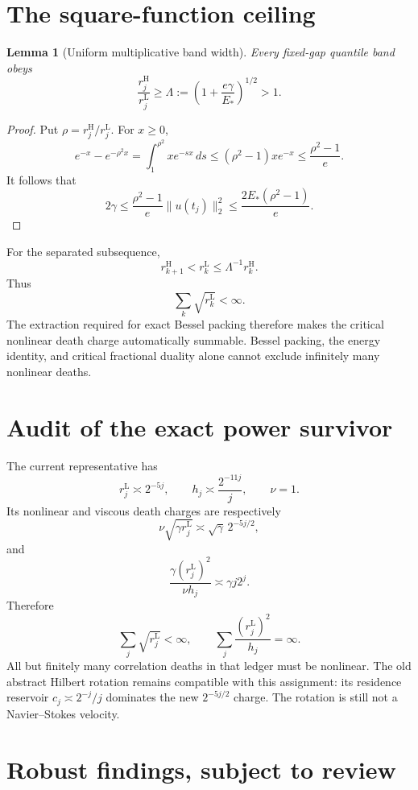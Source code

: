 \documentclass[11pt]{article}
\newtheorem{lemma}[theorem]{Lemma}
\theoremstyle{remark}
\begin{document}
\section{The square-function ceiling}

\begin{lemma}[Uniform multiplicative band width]
Every fixed-gap quantile band obeys
\[
 \frac{r_j^{\mathrm H}}{r_j^{\mathrm L}}
 \ge
 \Lambda
 :=
 \left(1+\frac{e\gamma}{E_*}\right)^{1/2}>1.
\]
\end{lemma}

\begin{proof}
Put \(\rho=r_j^{\mathrm H}/r_j^{\mathrm L}\).  For \(x\ge0\),
\[
 e^{-x}-e^{-\rho^2x}
 =
 \int_1^{\rho^2}xe^{-sx}\,ds
 \le
 (\rho^2-1)xe^{-x}
 \le
 \frac{\rho^2-1}{e}.
\]
It follows that
\[
 2\gamma
 \le
 \frac{\rho^2-1}{e}\|u(t_j)\|_2^2
 \le
 \frac{2E_*(\rho^2-1)}{e}.
\]
\end{proof}

For the separated subsequence,
\[
 r_{k+1}^{\mathrm H}
 <
 r_k^{\mathrm L}
 \le
 \Lambda^{-1}r_k^{\mathrm H}.
\]
Thus
\[
 \sum_k\sqrt{r_k^{\mathrm L}}<\infty.
\]
The extraction required for exact Bessel packing therefore makes the
critical nonlinear death charge automatically summable.  Bessel packing,
the energy identity, and critical fractional duality alone cannot exclude
infinitely many nonlinear deaths.

\section{Audit of the exact power survivor}

The current representative has
\[
 r_j^{\mathrm L}\asymp2^{-5j},
 \qquad
 h_j\asymp\frac{2^{-11j}}j,
 \qquad
 \nu=1.
\]
Its nonlinear and viscous death charges are respectively
\[
 \nu\sqrt{\gamma r_j^{\mathrm L}}
 \asymp
 \sqrt\gamma\,2^{-5j/2},
\]
and
\[
 \frac{\gamma(r_j^{\mathrm L})^2}{\nu h_j}
 \asymp
 \gamma j2^j.
\]
Therefore
\[
 \sum_j\sqrt{r_j^{\mathrm L}}<\infty,
 \qquad
 \sum_j\frac{(r_j^{\mathrm L})^2}{h_j}=\infty.
\]
All but finitely many correlation deaths in that ledger must be nonlinear.
The old abstract Hilbert rotation remains compatible with this assignment:
its residence reservoir \(c_j\asymp2^{-j}/j\) dominates the new
\(2^{-5j/2}\) charge.  The rotation is still not a Navier--Stokes velocity.

\section{Robust findings, subject to review}
\end{document}
